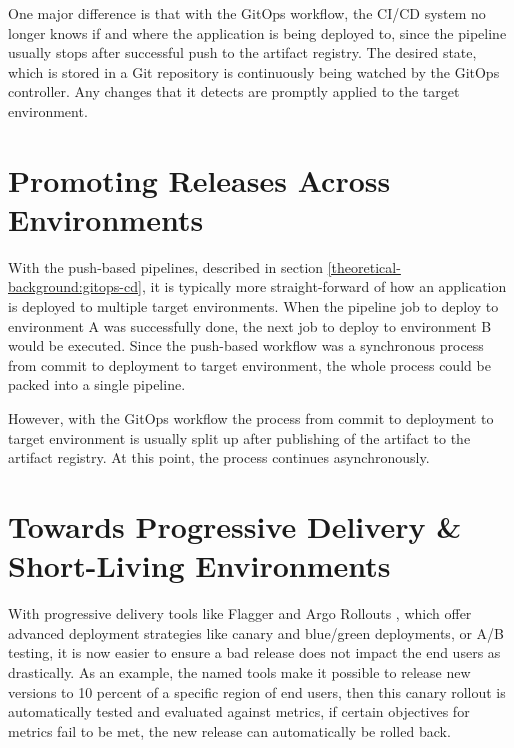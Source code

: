 One major difference is that with the GitOps workflow,
the CI/CD system no longer knows if and where the application is being
deployed to, since the pipeline usually stops after successful push to the artifact registry.
The desired state, which is stored in a Git repository is continuously being watched
by the GitOps controller. Any changes that it detects are promptly applied to the
target environment.











\section{Promoting Releases Across Environments}

With the push-based pipelines, described in section
\ref{theoretical-background:gitops-cd},
it is typically more straight-forward of how an application
is deployed to multiple target environments.
When the pipeline job to deploy to environment A was successfully done,
the next job to deploy to environment B would be executed.
Since the push-based workflow was a synchronous process from commit
to deployment to target environment,
the whole process could be packed into a single pipeline.

However, with the GitOps workflow the process from
commit to deployment to target environment is usually split up after
publishing of the artifact to the artifact registry.
At this point, the process continues asynchronously.







\section{Towards Progressive Delivery \& Short-Living Environments}

With progressive delivery tools like
Flagger
\autocite{flaggerWebsite}
and
Argo Rollouts
\autocite{argoRolloutsWebsite},
which offer advanced deployment strategies
like canary and blue/green deployments, or A/B testing,
it is now easier to ensure a bad release does not impact the end users
as drastically.
As an example, the named tools make it possible to release new versions
to 10 percent of a specific region of end users,
then this canary rollout is automatically tested and evaluated against metrics,
if certain objectives for metrics fail to be met,
the new release can automatically be rolled back.

